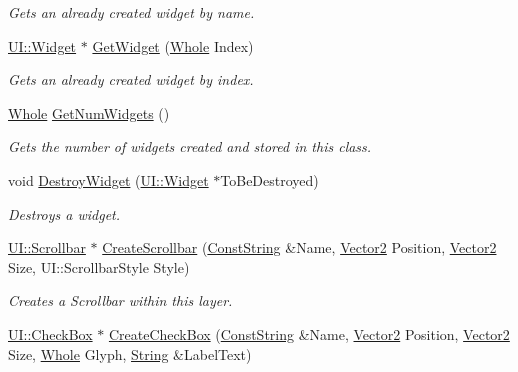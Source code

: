 \begin{DoxyCompactItemize}
\begin{DoxyCompactList}\small\item\em Gets an already created widget by name. \item\end{DoxyCompactList}\item 
\hyperlink{classphys_1_1UI_1_1Widget}{UI::Widget} $\ast$ \hyperlink{classphys_1_1UILayer_ab16bb514422f10dab03dca0a6f269a66}{GetWidget} (\hyperlink{namespacephys_a460f6bc24c8dd347b05e0366ae34f34a}{Whole} Index)
\begin{DoxyCompactList}\small\item\em Gets an already created widget by index. \item\end{DoxyCompactList}\item 
\hyperlink{namespacephys_a460f6bc24c8dd347b05e0366ae34f34a}{Whole} \hyperlink{classphys_1_1UILayer_aa745147022b7f78cdc5bccca57985459}{GetNumWidgets} ()
\begin{DoxyCompactList}\small\item\em Gets the number of widgets created and stored in this class. \item\end{DoxyCompactList}\item 
void \hyperlink{classphys_1_1UILayer_a5c8d3069ecbc38669251532dc5860e5e}{DestroyWidget} (\hyperlink{classphys_1_1UI_1_1Widget}{UI::Widget} $\ast$ToBeDestroyed)
\begin{DoxyCompactList}\small\item\em Destroys a widget. \item\end{DoxyCompactList}\item 
\hyperlink{classphys_1_1UI_1_1Scrollbar}{UI::Scrollbar} $\ast$ \hyperlink{classphys_1_1UILayer_a50643d43ad6e251aafc817e22c2d6a19}{CreateScrollbar} (\hyperlink{namespacephys_a5ce5049f8b4bf88d6413c47b504ebb31}{ConstString} \&Name, \hyperlink{classphys_1_1Vector2}{Vector2} Position, \hyperlink{classphys_1_1Vector2}{Vector2} Size, UI::ScrollbarStyle Style)
\begin{DoxyCompactList}\small\item\em Creates a Scrollbar within this layer. \item\end{DoxyCompactList}\item 
\hyperlink{classphys_1_1UI_1_1CheckBox}{UI::CheckBox} $\ast$ \hyperlink{classphys_1_1UILayer_ad9a60f201b1c0d9d891ea985a5a3c1e3}{CreateCheckBox} (\hyperlink{namespacephys_a5ce5049f8b4bf88d6413c47b504ebb31}{ConstString} \&Name, \hyperlink{classphys_1_1Vector2}{Vector2} Position, \hyperlink{classphys_1_1Vector2}{Vector2} Size, \hyperlink{namespacephys_a460f6bc24c8dd347b05e0366ae34f34a}{Whole} Glyph, \hyperlink{namespacephys_aa03900411993de7fbfec4789bc1d392e}{String} \&LabelText)

\end{DoxyCompactItemize}
